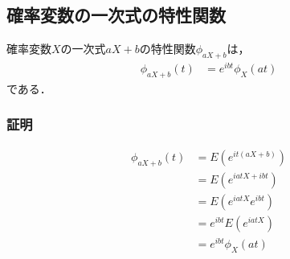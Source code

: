 \documentclass[dvipdfmx]{jsarticle}
\begin{document}
 \subsection{確率変数の一次式の特性関数}
確率変数$X$の一次式$aX+b$の特性関数$\phi_{aX+b}$は，
 \begin{align}
  \phi_{aX+b}\left(t\right)&=e^{ibt}\phi_{X}\left(at\right)
 \end{align}
である．
 \subsubsection{証明}
 \begin{align}
  \phi_{aX+b}\left(t\right)&=E\left(e^{it\left(aX+b\right)}\right)\nonumber\\
  &=E\left(e^{iatX+ibt}\right)\nonumber\\
  &=E\left(e^{iatX}e^{ibt}\right)\nonumber\\
  &=e^{ibt}E\left(e^{iatX}\right)\nonumber\\
  &=e^{ibt}\phi_{X}\left(at\right)
 \end{align}
\end{document}
